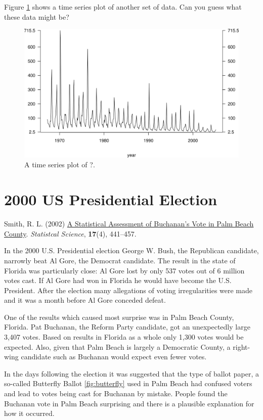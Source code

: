 \documentclass[
  11pt,
  british,
  openany, a4paper]{book}
\begin{document}
Figure \ref{fig:fluts} shows a time series plot of another set of data. Can you guess what these data might be?

\begin{figure}

{\centering \includegraphics[width=0.75\linewidth]{images/flu_tufte_no_label} 

}

\caption{A time series plot of ?.}\label{fig:fluts}
\end{figure}

\hypertarget{election}{%
\section{2000 US Presidential Election}\label{election}}

Smith, R. L. (2002) \href{https://doi.org/10.1214/ss/1049993203}{A Statistical Assessment of Buchanan's Vote in Palm Beach County}. \emph{Statistcal Science}, \textbf{17}(4), 441--457.

In the 2000 U.S. Presidential election George W. Bush, the Republican candidate, narrowly beat Al Gore, the Democrat candidate. The result in the state of Florida was particularly close: Al Gore lost by only 537 votes out of 6 million votes cast. If Al Gore had won in Florida he would have become the U.S. President. After the election many allegations of voting irregularities were made and it was a month before Al Gore conceded defeat.

One of the results which caused most surprise was in Palm Beach County, Florida. Pat Buchanan, the Reform Party candidate, got an unexpectedly large 3,407 votes. Based on results in Florida as a whole only 1,300 votes would be expected. Also, given that Palm Beach is largely a Democratic County, a right-wing candidate such as Buchanan would expect even fewer votes.

In the days following the election it was suggested that the type of ballot paper, a so-called Butterfly Ballot \ref{fig:butterfly} used in Palm Beach had confused voters and lead to votes being cast for Buchanan by mistake. People found the Buchanan vote in Palm Beach surprising and there is a plausible explanation for how it occurred.
\end{document}
